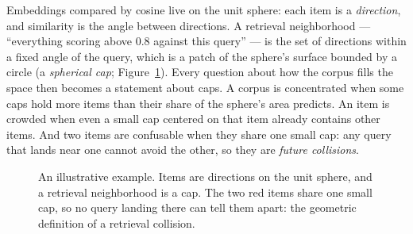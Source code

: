 \documentclass[11pt,letterpaper]{article}
\begin{document}
Embeddings compared by cosine live on the unit sphere: each item is a
\emph{direction}, and similarity is the angle between directions. A
retrieval neighborhood --- ``everything scoring above $0.8$ against this
query'' --- is the set of directions within a fixed angle of the query,
which is a patch of the sphere's surface bounded by a circle (a
\emph{spherical cap}; Figure~\ref{fig:cap}). Every question about how the corpus fills the space then
becomes a statement about caps. A corpus is concentrated when some caps
hold more items than their share of the sphere's area predicts. An item is crowded when even a small cap centered on that item
already contains other items. And
two items are confusable when they share one small cap: any query that
lands near one cannot avoid the other, so they are \emph{future
collisions}.

\begin{figure}[t]
\centering
{}
\caption{An illustrative example. Items are directions on the unit
sphere,
and a retrieval neighborhood is a cap. The two red items share one small
cap, so no query landing there can tell them apart: the geometric
definition of a retrieval collision.}
\label{fig:cap}
\end{figure}
\end{document}
